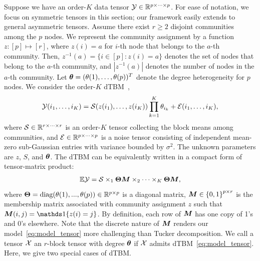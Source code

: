 \documentclass[lettersize,onecolumn,journal]{IEEEtran}
\theoremstyle{definition}
\theoremstyle{definition}
\newcommand{\offf}[1]{\left\{#1\right\}}
\begin{document}
Suppose we have an order-$K$ data tensor $\mathcal{Y} \in \mathbb{R}^{p \times \cdots \times p}$. For ease of notation, we focus on symmetric tensors in this section; our framework easily extends to general asymmetric tensors. Assume there exist $r \geq 2$  disjoint communities among the $p$ nodes. We represent the community assignment by a function $z \colon [p]\mapsto[r]$, where $z(i) = a$ for $i$-th node that belongs to the $a$-th community. Then, $z^{-1}(a)=\{i\in[p]\colon z(i)=a\}$ denotes the set of nodes that belong to the $a$-th community, and $|z^{-1}(a)|$ denotes the number of nodes in the $a$-th community.
Let $\boldsymbol{\theta}=(\theta(1),\ldots,\theta(p))^T$ denote the degree heterogeneity for $p$ nodes. We consider the order-$K$ dTBM~\citep{ghoshdastidar2017consistency,ke2019community},
\begin{equation}\label{eq:model_margin}
    \tY(i_1,\ldots,i_K) = \tS(z(i_1),\ldots,z(i_K)) \prod_{k = 1}^K\theta_{i_k} + \tE(i_1,\ldots,i_K), 
\end{equation}
\normalsize
where $\mathcal{S} \in \mathbb{R}^{r \times \cdots \times r}$ is an order-$K$ tensor collecting the block means among communities, and $\mathcal{E}\in\mathbb{R}^{p\times \cdots \times p}$ is a noise tensor consisting of independent mean-zero sub-Gaussian entries with variance bounded by $\sigma^2$. The unknown parameters are $z$, $S$, and $\boldsymbol{\theta}$. The dTBM can be equivalently written in a compact form of tensor-matrix product:
\begin{equation}\label{eq:model_tensor}
 \mathbb{E}\tY = \tS \times_1 \mTheta \mM \times_2 \cdots \times_K  \mTheta \mM,
\end{equation}
where $\boldsymbol{\Theta} = \text{diag}(\theta(1),...,\theta(p)) \in \mathbb{R}^{p \times p}$ is a diagonal matrix, $\mM \in \offf{0,1}^{p \times r}$ is the membership matrix associated with community assignment $z$ such that $\mM(i,j)=\ind\{z(i)=j\}$. By definition, each row of $\bm M$ has one copy of 1's and 0's elsewhere. Note that the discrete nature of $\bm M$ renders our model~\eqref{eq:model_tensor} more challenging than Tucker decomposition. %
We call a tensor $\mathcal{X}$ an $r$-block tensor with degree $\boldsymbol{\theta}$
if $\mathcal{X}$ admits dTBM~\eqref{eq:model_tensor}. Here, we give two special cases of dTBM.
\end{document}
